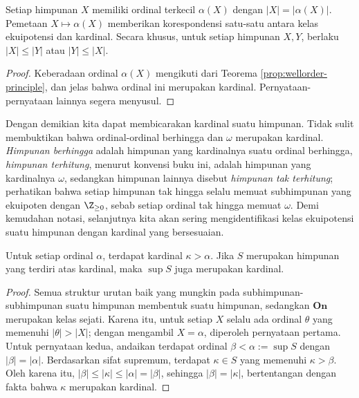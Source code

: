\begin{proposition}
	Setiap himpunan $X$ memiliki ordinal terkecil $\alpha(X)$ dengan $|X|=|\alpha(X)|$. Pemetaan $X \mapsto \alpha(X)$ memberikan korespondensi satu-satu antara kelas ekuipotensi dan kardinal. Secara khusus, untuk setiap himpunan $X, Y$, berlaku $|X| \leq |Y|$ atau $|Y| \leq |X|$.
\end{proposition}
\begin{proof}
  Keberadaan ordinal $\alpha(X)$ mengikuti dari Teorema \ref{prop:wellorder-principle}, dan jelas bahwa ordinal ini merupakan kardinal. Pernyataan-pernyataan lainnya segera menyusul.
\end{proof}

Dengan demikian kita dapat membicarakan kardinal suatu himpunan. Tidak sulit membuktikan bahwa ordinal-ordinal berhingga dan $\omega$ merupakan kardinal. \emph{Himpunan berhingga} adalah himpunan yang kardinalnya suatu ordinal berhingga, \emph{himpunan terhitung}, menurut konvensi buku ini, adalah himpunan yang kardinalnya $\omega$, sedangkan himpunan lainnya disebut \emph{himpunan tak terhitung}; perhatikan bahwa setiap himpunan tak hingga selalu memuat subhimpunan yang ekuipoten dengan $\Z_{\geq 0}$, sebab setiap ordinal tak hingga memuat $\omega$. Demi kemudahan notasi, selanjutnya kita akan sering mengidentifikasi kelas ekuipotensi suatu himpunan dengan kardinal yang bersesuaian. 

\begin{lemma}\label{prop:cardinal-sup}
	Untuk setiap ordinal $\alpha$, terdapat kardinal $\kappa > \alpha$. Jika $S$ merupakan himpunan yang terdiri atas kardinal, maka $\sup S$ juga merupakan kardinal.
\end{lemma}
\begin{proof}
	Semua struktur urutan baik yang mungkin pada subhimpunan-subhimpunan suatu himpunan membentuk suatu himpunan, sedangkan $\textbf{On}$ merupakan kelas sejati. Karena itu, untuk setiap $X$ selalu ada ordinal $\theta$ yang memenuhi $|\theta| > |X|$; dengan mengambil $X=\alpha$, diperoleh pernyataan pertama. Untuk pernyataan kedua, andaikan terdapat ordinal $\beta < \alpha := \sup S$ dengan $|\beta| = |\alpha|$. Berdasarkan sifat supremum, terdapat $\kappa \in S$ yang memenuhi $\kappa > \beta$. Oleh karena itu, $|\beta| \leq |\kappa| \leq |\alpha| = |\beta|$, sehingga $|\beta|=|\kappa|$, bertentangan dengan fakta bahwa $\kappa$ merupakan kardinal.
\end{proof}

